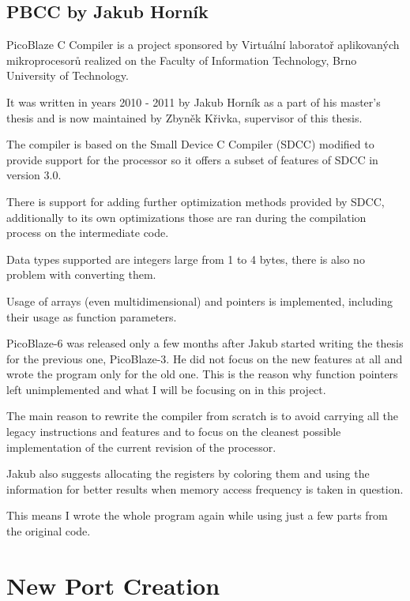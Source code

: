     \section{PBCC by Jakub Horník}\label{prev_pbcc}


    PicoBlaze C Compiler is a project sponsored by Virtuální laboratoř aplikovaných mikroprocesorů 
    realized on the Faculty of Information Technology, Brno University of Technology.

    It was written in years 2010 - 2011 by Jakub Horník as a part of his master's thesis and is now maintained by Zbyněk Křivka, supervisor of this thesis.

    The compiler is based on the Small Device C Compiler (SDCC) modified to provide support for the processor so it offers a subset of features of SDCC in version 3.0.

    There is support for adding further optimization methods provided by SDCC, additionally to its own optimizations those are ran during the compilation process on the intermediate code.

    Data types supported are integers large from 1 to 4 bytes, there is also no problem with converting them.

    Usage of arrays (even multidimensional) and pointers is implemented, including their usage as function parameters.

    PicoBlaze-6 was released only a few months after Jakub started writing the thesis for the previous one, PicoBlaze-3. 
    He did not focus on the new features at all and wrote the program only for the old one.
    This is the reason why function pointers left unimplemented and what I will be focusing on in this project.

    The main reason to rewrite the compiler from scratch is to avoid carrying all the legacy instructions and features and to focus on the cleanest possible implementation of the current revision of the processor.

    Jakub also suggests allocating the registers by coloring them and using the information for better results when memory access frequency is taken in question.

    This means I wrote the whole program again while using just a few parts from the original code.


\chapter{New Port Creation}\label{port}

